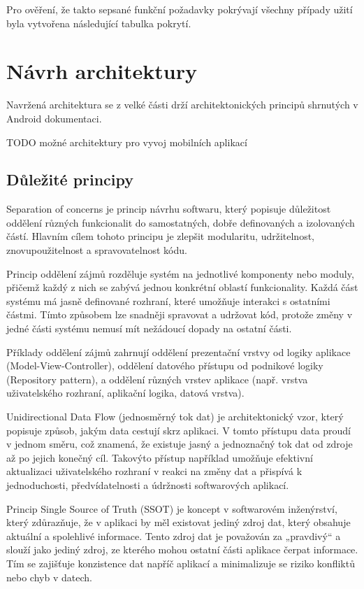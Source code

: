 Pro ověření, že takto sepsané funkční požadavky pokrývají všechny případy užití byla vytvořena následující tabulka pokrytí.  

\section{Návrh architektury}
Navržená architektura se z velké části drží architektonických principů shrnutých v Android dokumentaci. \cite{andDocArch}

TODO možné architektury pro vyvoj mobilních aplikací

\subsection*{Důležité principy}

Separation of concerns je princip návrhu softwaru, který popisuje důležitost oddělení různých funkcionalit do samostatných, dobře definovaných a izolovaných částí.
Hlavním cílem tohoto principu je zlepšit modularitu, udržitelnost, znovupoužitelnost a spravovatelnost kódu.

Princip oddělení zájmů rozděluje systém na jednotlivé komponenty nebo moduly, přičemž každý z nich se zabývá jednou konkrétní 
oblastí funkcionality. Každá část systému má jasně definované rozhraní, které umožňuje interakci s ostatními částmi. 
Tímto způsobem lze snadněji spravovat a udržovat kód, protože změny v jedné části systému nemusí mít nežádoucí dopady na ostatní části.

Příklady oddělení zájmů zahrnují oddělení prezentační vrstvy od logiky aplikace (Model-View-Controller), oddělení datového přístupu od 
podnikové logiky (Repository pattern), a oddělení různých vrstev aplikace (např. vrstva uživatelského rozhraní, aplikační logika, datová vrstva). 

Unidirectional Data Flow (jednosměrný tok dat) je architektonický vzor, který popisuje způsob, jakým data cestují skrz aplikaci. 
V tomto přístupu data proudí v jednom směru, což znamená, že existuje jasný a jednoznačný tok dat od zdroje až po jejich konečný cíl.
Takovýto přístup například umožňuje efektivní aktualizaci uživatelského rozhraní v reakci na změny dat a přispívá k jednoduchosti, 
předvídatelnosti a údržnosti softwarových aplikací.

Princip Single Source of Truth (SSOT) je koncept v softwarovém inženýrství, který zdůrazňuje, že v aplikaci by měl existovat jediný 
zdroj dat, který obsahuje aktuální a spolehlivé informace. Tento zdroj dat je považován za „pravdivý“ a slouží jako jediný zdroj, 
ze kterého mohou ostatní části aplikace čerpat informace. Tím se zajišťuje konzistence dat napříč aplikací a minimalizuje se riziko 
konfliktů nebo chyb v datech.

